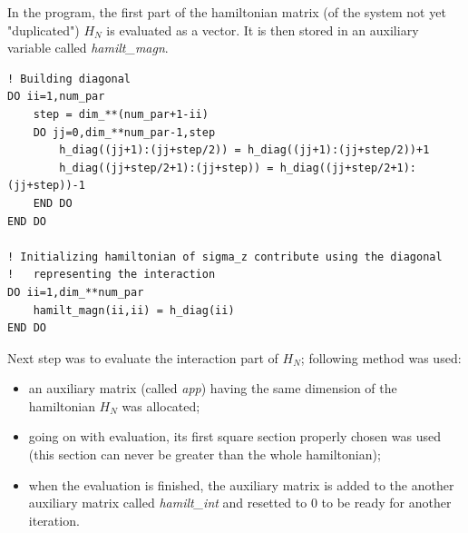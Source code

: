 \documentclass[12pt, a4paper, notitlepage]{report}
\begin{document}
In the program, the first part of the hamiltonian matrix (of the system not yet "duplicated") $H_N$ is evaluated as a vector. It is then stored in an auxiliary variable called \textit{hamilt\_magn}.

\begin{lstlisting}
! Building diagonal
DO ii=1,num_par
	step = dim_**(num_par+1-ii)
	DO jj=0,dim_**num_par-1,step
		h_diag((jj+1):(jj+step/2)) = h_diag((jj+1):(jj+step/2))+1
		h_diag((jj+step/2+1):(jj+step)) = h_diag((jj+step/2+1):(jj+step))-1
	END DO
END DO

! Initializing hamiltonian of sigma_z contribute using the diagonal
!	representing the interaction
DO ii=1,dim_**num_par
	hamilt_magn(ii,ii) = h_diag(ii)
END DO
\end{lstlisting}

Next step was to evaluate the interaction part of $H_N$; following method was used:
\begin{itemize}
	\item an auxiliary matrix (called \textit{app}) having the same dimension of the hamiltonian $H_N$ was allocated;
	
	\item going on with evaluation, its first square section properly chosen was used (this section can never be greater than the whole hamiltonian);
	
	\item when the evaluation is finished, the auxiliary matrix is added to the another auxiliary matrix called \textit{hamilt\_int} and resetted to 0 to be ready for another iteration.
\end{itemize}
\end{document}

